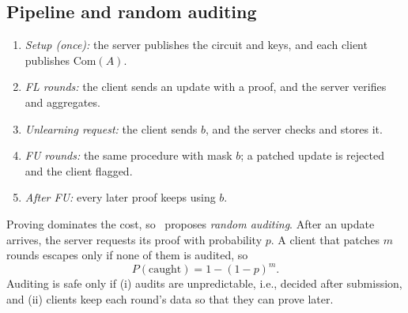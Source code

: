 \documentclass[conference]{IEEEtran}
\begin{document}
\subsection{Pipeline and random auditing}
\begin{enumerate}
\item \emph{Setup (once):} the server publishes the circuit and keys, and each client publishes
$\mathrm{Com}(A)$.
\item \emph{FL rounds:} the client sends an update with a proof, and the server verifies and
aggregates.
\item \emph{Unlearning request:} the client sends $b$, and the server checks and stores it.
\item \emph{FU rounds:} the same procedure with mask $b$; a patched update is rejected and the
client flagged.
\item \emph{After FU:} every later proof keeps using $b$.
\end{enumerate}
Proving dominates the cost, so~\cite{zkdesign} proposes \emph{random auditing}. After an update
arrives, the server requests its proof with probability $p$. A client that patches $m$ rounds
escapes only if none of them is audited, so
\begin{equation}
P(\text{caught})=1-(1-p)^m .\label{eq:audit}
\end{equation}
Auditing is safe only if (i) audits are unpredictable, i.e., decided after submission, and (ii)
clients keep each round's data so that they can prove later.
\end{document}
